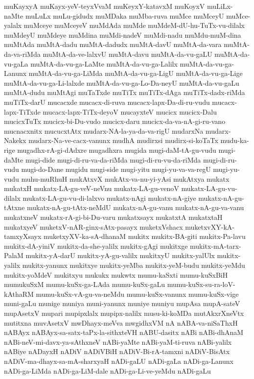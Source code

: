 {muKayxyA
muKayx-yeV-teyxVvaM
muKeyxY-katavxM
muKoyxV
muLiLx-naMte
muLuLx
muLu-gidudx
muMDaka
muMba-ruva
muMce
muMceyU
muMce-yalalx
muMceye
muMceyeV
muMdAda
muMde
muMdeM-dU-hu-TuTx-vu-dilalx
muMdeyU
muMdeye
muMdina
muMdi-nadeV
muMdi-nadu
muMdu-muM-dina
muMtAda
muMtA-dadu
muMtA-dadudx
muMtA-davU
muMtA-da-vara
muMtA-da-va-riMda
muMtA-da-ve-lalxvU
muMtA-davu
muMtA-da-vu-gaLU
muMtA-da-vu-gaLa
muMtA-da-vu-ga-LaMte
muMtA-da-vu-ga-Lalilx
muMtA-da-vu-ga-Lanunx
muMtA-da-vu-ga-LiMda
muMtA-da-vu-ga-LigU
muMtA-da-vu-ga-Lige
muMtA-da-vu-ga-Li-lalxde
muMtA-da-vu-ga-Lo-Da-neyU
muMtA-da-vu-gaLu
muMtA-dudu
muMtAgi
muTaTxde
muTiTx
muTiTx-dAga
muTiTx-dadx-riMda
muTiTx-darU
mucacxde
mucacx-di-ruva
mucacx-lapx-Da-di-ru-vudu
mucacx-lapx-TiTxde
mucacx-lapx-TiTx-deyoV
mucayxteV
mucicx
mucicx-Dalu
mucicxTuTx
mucicx-bi-Du-vudo
mucicx-daru
mucicx-da-va-nA-gi-ru-vano
mucnacxnitx
mucucxtAtx
mudarx-NA-la-ya-da-va-rigU
mudarxNa
mudarx-Nakekx
mudarx-Na-ve-cacx-vanunx
mudhA
mudirxsi
mudirx-si-koTaTx
mudu-ka-rige
mugadhx-rA-gi-dAdxre
mugadhxra
mugida
mugi-daM-tA-gu-vudu
mugi-daMte
mugi-dide
mugi-di-ru-va-da-riMda
mugi-di-ru-vu-da-riMda
mugi-di-ru-vudu
mugi-do-Dane
mugidu
mugi-side
mugi-yitu
mugi-yu-va-va-regU
mugi-yu-vudu
muhu-muRhuH
mukAtxvX
mukAtx-va-nu-yi-yAsi
mukAtxya
mukatx
mukatxH
mukatx-LA-gu-veV-neVnu
mukatx-LA-gu-venoV
mukatx-LA-gu-vu-dilalx
mukatx-LA-gu-vu-di-lalxvo
mukatx-nAgi
mukatx-nA-giye
mukatx-nA-gu-tAtxne
mukatx-nA-gu-tAtx-neMdU
mukatx-nA-gu-vanu
mukatx-nA-gu-va-vanu
mukatxneV
mukatx-rA-gi-bi-Du-varu
mukatxsayx
mukatxtA
mukatxtaH
mukatxyeV
muketxV-nAR-ginx-sAtx-pasayx
muketxVshacx
muketxvXY-kA-tamxyXsayx
muketxyXV-ka-sA-dhanaM
mukitx
mukitx-BA-giti
mukitx-Pa-lavu
mukitx-dA-yiniV
mukitx-da-she-yalilx
mukitx-gAgi
mukitxge
mukitx-mA-tarx-PalaM
mukitx-yA-darU
mukitx-yA-gu-valilx
mukitxyU
mukitx-yalUlx
mukitx-yalilx
mukitx-yanunx
mukitxye
mukitx-yeMba
mukitx-yeM-budu
mukitx-yeMdu
mukitx-yoMdeV
mukitxyu
mukukx
mukwtx
mumu-kaSxti
mumu-kuSxBiH
mumukuSxM
mumu-kuSx-ga-LAda
mumu-kuSx-gaLu
mumu-kuSx-su-ra-loV-kAthaRM
mumu-kuSx-vA-gu-va-neMdu
mumu-kuSx-vanunx
mumu-kuSx-vige
muni-gaLu
munige
muniya
muni-yanunx
muniye
muniyu
mupAsa
mupA-sateV
mupAsetxV
mupari
mupipxlalx
mupipx-nalilx
musu-ki-koMDa
mutAkxrXneVtx
mutitxna
muvAsetxV
mwDhayx-meVva
mwgidhxVM
nA
nABA-va-niSaThxH
nABAyx
nABAyx-sa-satx-taPx-la-sithxteVH
nABU-dasitx
nABi
nABi-dhAnaM
nABi-neV-mi-davx-ya-sAthxneV
nABi-yaMte
nABi-yaM-ti-ruva
nABi-yalilx
nABiye
nADayxH
nADiV
nADiVBiH
nADiV-Bi-rA-tamxni
nADiV-BisAtx
nADiV-ma-dhayx-sa-mA-sharxyaH
nADi-gaLU
nADi-gaLa
nADi-ga-Lanunx
nADi-ga-LiMda
nADi-ga-LiM-dale
nADi-ga-Li-ve-yeMdu
nADi-gaLu
}
